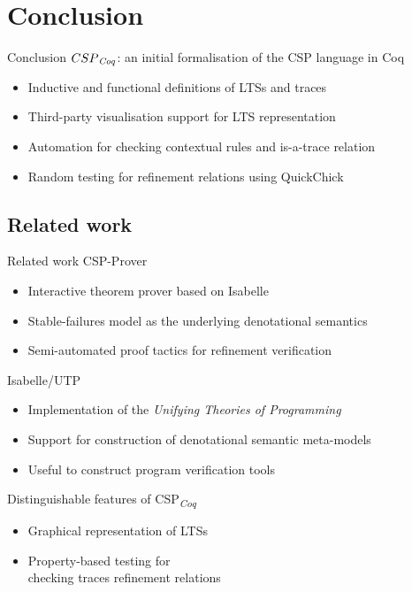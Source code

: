 \documentclass[t]{beamer}
\newcommand{\CSPcoq}{CSP\textsubscript{\textit{Coq}}}
\begin{document}
\section{Conclusion}

\begin{frame}{Conclusion}
	$\CSPcoq{}$: an initial formalisation of the CSP language in Coq\\[1ex]
	\begin{itemize}
		\item Inductive and functional definitions of LTSs and traces\\[2ex]
		\item Third-party visualisation support for LTS representation\\[2ex]
		\item Automation for checking contextual rules and is-a-trace relation\\[2ex]
		\item Random testing for refinement relations using QuickChick
	\end{itemize}
\end{frame}

\subsection{Related work}

\begin{frame}{Related work}
	CSP-Prover
	\begin{itemize}
		\item Interactive theorem prover based on Isabelle
		\item Stable-failures model as the underlying denotational semantics
		\item Semi-automated proof tactics for refinement verification
	\end{itemize}
	\vskip 0.15in
	Isabelle/UTP
	\begin{itemize}
		\item Implementation of the \emph{Unifying Theories of Programming}
		\item Support for construction of denotational semantic meta-models
		\item Useful to construct program verification tools
	\end{itemize}
	\vskip 0.15in
	Distinguishable features of \CSPcoq{}
	\begin{itemize}
		\item Graphical representation of LTSs
		\item Property-based testing for\\checking traces refinement relations
	\end{itemize}
\end{frame}
\end{document}

